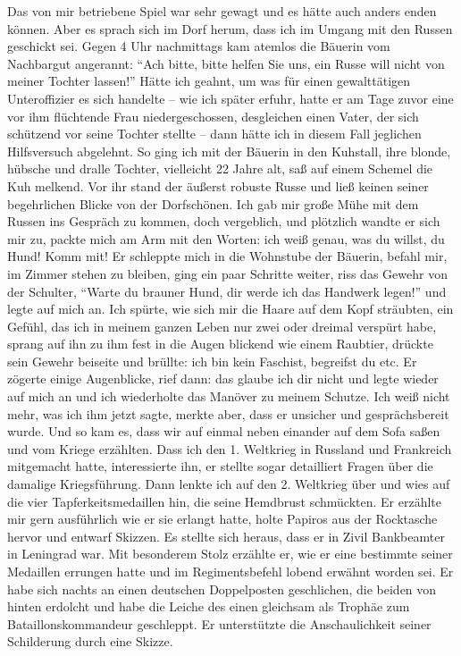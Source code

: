 Das von mir betriebene Spiel war sehr gewagt und es hätte auch anders enden können. Aber es sprach sich im Dorf herum, dass ich im Umgang mit den Russen geschickt  sei. Gegen 4 Uhr nachmittags kam atemlos die Bäuerin vom Nachbargut angerannt: \enquote{Ach bitte, bitte helfen Sie uns, ein Russe will nicht von meiner Tochter lassen!} Hätte ich geahnt, um was für einen gewalttätigen Unteroffizier es sich handelte -- wie ich später erfuhr, hatte er am Tage zuvor eine vor ihm flüchtende Frau niedergeschossen, desgleichen einen Vater, der sich schützend vor seine Tochter stellte -- dann hätte ich in diesem Fall jeglichen Hilfsversuch abgelehnt. So ging ich mit der Bäuerin in den Kuhstall, ihre blonde, hübsche und dralle Tochter, vielleicht 22 Jahre alt, saß auf einem Schemel die Kuh melkend. Vor ihr stand der äußerst robuste Russe und ließ keinen seiner begehrlichen Blicke von der Dorfschönen. Ich gab mir große Mühe mit dem Russen ins Gespräch zu kommen, doch vergeblich, und plötzlich wandte er sich mir zu, packte mich am Arm mit den Worten: ich weiß genau, was du willst, du Hund! Komm mit! Er schleppte mich in die Wohnstube der Bäuerin, befahl mir, im Zimmer stehen zu bleiben, ging ein paar Schritte weiter, riss das Gewehr von der Schulter, \enquote{Warte du brauner Hund, dir werde ich das Handwerk legen!} und  legte auf mich an. Ich spürte, wie sich mir die Haare auf dem Kopf sträubten, ein Gefühl, das ich in meinem ganzen Leben nur zwei oder dreimal verspürt habe, sprang auf ihn zu ihm fest in die Augen blickend wie einem Raubtier, drückte sein Gewehr beiseite und brüllte: ich bin kein Faschist, begreifst du etc. Er zögerte einige Augenblicke, rief dann: das glaube ich dir nicht und legte wieder auf mich an und ich wiederholte das Manöver zu meinem Schutze. Ich weiß nicht mehr, was ich ihm jetzt sagte, merkte aber, dass er unsicher und gesprächsbereit wurde. Und so kam es, dass wir auf einmal neben einander auf dem Sofa saßen und vom Kriege erzählten. Dass ich den 1. Weltkrieg in Russland und Frankreich mitgemacht hatte, interessierte ihn, er stellte sogar detailliert Fragen über die damalige Kriegsführung. Dann lenkte ich auf den 2. Weltkrieg über und wies auf die vier Tapferkeitsmedaillen hin, die seine Hemdbrust schmückten. Er erzählte mir gern ausführlich wie er sie erlangt hatte, holte Papiros aus der Rocktasche hervor und entwarf Skizzen. Es stellte sich heraus, dass er in Zivil Bankbeamter in Leningrad  war. Mit besonderem Stolz erzählte er, wie er eine bestimmte seiner Medaillen errungen hatte und im Regimentsbefehl lobend erwähnt worden sei. Er habe sich nachts an einen deutschen Doppelposten geschlichen, die beiden von hinten erdolcht und habe die Leiche des einen gleichsam als Trophäe zum Bataillonskommandeur geschleppt. Er unterstützte die Anschaulichkeit seiner Schilderung durch eine Skizze.

